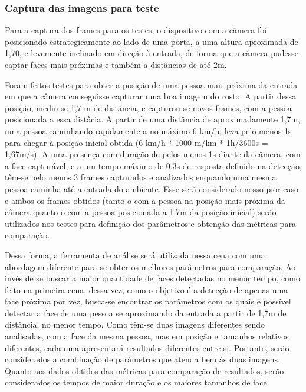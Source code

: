 \subsubsection{Captura das imagens para teste}

Para a captura dos frames para os testes, o dispositivo com a câmera foi posicionado estrategicamente ao lado de uma porta, a uma altura aproximada de 1,70, e levemente inclinado em direção à entrada, de forma que a câmera pudesse captar faces mais próximas e também a distâncias de até 2m.

Foram feitos testes para obter a posição de uma pessoa mais próxima da entrada em que a câmera conseguisse capturar uma boa imagem do rosto. A partir dessa posição, mediu-se 1,7 m de distância, e capturou-se novos frames, com a pessoa posicionada a essa distâcia. A partir de uma distância de aproximadamente 1,7m, uma pessoa caminhando rapidamente a no máximo 6 km/h, leva pelo menos 1s para chegar à posição inicial obtida (6 km/h * 1000 m/km * 1h/3600s = 1,67m/s). A uma presença com duração de pelos menos 1s diante da câmera, com a face capturável, e a um tempo máximo de 0.3s de resposta definido na detecção, têm-se pelo menos 3 frames capturados e analizados enquando uma mesma pessoa caminha até a entrada do ambiente. Esse será considerado nosso pior caso e ambos os frames obtidos (tanto o com a pessoa na posição mais próxima da câmera quanto o com a pessoa posicionada a 1.7m da posição inicial) serão utilizados nos testes para definição dos parâmetros e obtenção das métricas para comparação. \label{sssec:memoria_calculo}

Dessa forma, a ferramenta de análise será utilizada nessa cena com uma abordagem diferente para se obter os melhores parâmetros para comparação. Ao invés de se buscar a maior quantidade de faces detectadas no menor tempo, como feito na primeira cena, dessa vez, como o objetivo é a detecção de apenas uma face próxima por vez, busca-se encontrar os parâmetros com os quais é possível detectar a face de uma pessoa se aproximando da entrada a partir de 1,7m de distância, no menor tempo. Como têm-se duas imagens diferentes sendo analisadas, com a face da mesma pessoa, mas em posição e tamanhos relativos diferentes, cada uma apresentará resultados diferentes entre si. Portanto, serão considerados a combinação de parâmetros que atenda bem às duas imagens. Quanto aos dados obtidos das métricas para comparação de resultados, serão considerados os tempos de maior duração e os maiores tamanhos de face.

